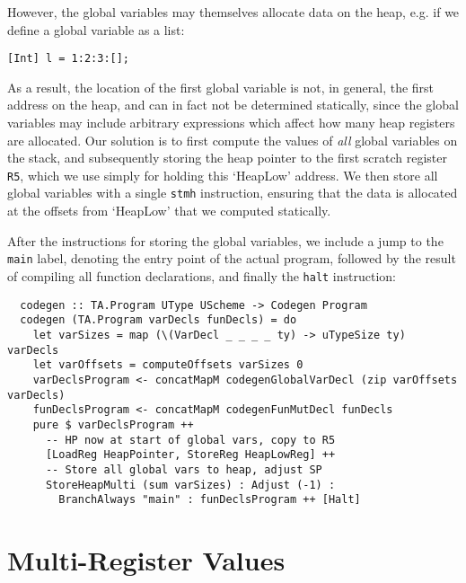 However, the global variables may themselves allocate data on the heap, e.g. if
we define a global variable as a list:
\begin{lstlisting}[language=spl]
  [Int] l = 1:2:3:[];
\end{lstlisting}
%
As a result, the location of the first global variable is not, in general, the
first address on the heap, and can in fact not be determined statically, since
the global variables may include arbitrary expressions which affect how many
heap registers are allocated.
Our solution is to first compute the values of \emph{all} global variables on
the stack, and subsequently storing the heap pointer to the first scratch
register \texttt{R5}, which we use simply for holding this `HeapLow' address.
We then store all global variables with a single \texttt{stmh} instruction,
ensuring that the data is allocated at the offsets from `HeapLow' that we
computed statically.

After the instructions for storing the global variables, we include a jump to
the \texttt{main} label, denoting the entry point of the actual program,
followed by the result of compiling all function declarations, and finally the
\texttt{halt} instruction:
%
\begin{verbatim}
  codegen :: TA.Program UType UScheme -> Codegen Program
  codegen (TA.Program varDecls funDecls) = do
    let varSizes = map (\(VarDecl _ _ _ _ ty) -> uTypeSize ty) varDecls
    let varOffsets = computeOffsets varSizes 0
    varDeclsProgram <- concatMapM codegenGlobalVarDecl (zip varOffsets varDecls)
    funDeclsProgram <- concatMapM codegenFunMutDecl funDecls
    pure $ varDeclsProgram ++
      -- HP now at start of global vars, copy to R5
      [LoadReg HeapPointer, StoreReg HeapLowReg] ++
      -- Store all global vars to heap, adjust SP
      StoreHeapMulti (sum varSizes) : Adjust (-1) :
        BranchAlways "main" : funDeclsProgram ++ [Halt]
\end{verbatim}



\section{Multi-Register Values} \label{sec:codegen-multi-reg-vals}

